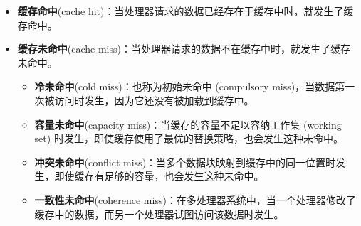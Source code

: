 \begin{itemize}
    \item \textbf{缓存命中}(cache hit)：当处理器请求的数据已经存在于缓存中时，就发生了缓存命中。
    \item \textbf{缓存未命中}(cache miss)：当处理器请求的数据不在缓存中时，就发生了缓存未命中。
    \begin{itemize}
        \item \textbf{冷未命中}(cold miss)：也称为初始未命中 (compulsory miss)，当数据第一次被访问时发生，因为它还没有被加载到缓存中。
        \item \textbf{容量未命中}(capacity miss)：当缓存的容量不足以容纳工作集 (working set) 时发生，即使缓存使用了最优的替换策略，也会发生这种未命中。
        \item \textbf{冲突未命中}(conflict miss)：当多个数据块映射到缓存中的同一位置时发生，即使缓存有足够的容量，也会发生这种未命中。
        \item \textbf{一致性未命中}(coherence miss)：在多处理器系统中，当一个处理器修改了缓存中的数据，而另一个处理器试图访问该数据时发生。
    \end{itemize}
\end{itemize}